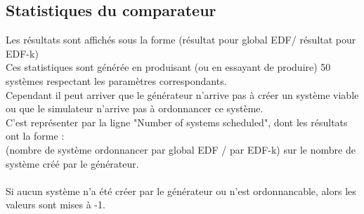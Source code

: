 \documentclass[a4paper,10pt]{article}
\begin{document}
	  
	 \subsection{Statistiques du comparateur}

		Les résultats sont affichés sous la forme (résultat pour global EDF/ résultat pour EDF-k)\\
		Ces statistiques sont générée en produisant (ou en essayant de produire) 50 systèmes respectant les paramètres correspondants.\\
		Cependant il peut arriver que le générateur n'arrive pas à créer un système viable ou que le simulateur n'arrive pas à ordonnancer ce système.\\
		C'est représenter par la ligne "Number of systems scheduled", dont les résultats ont la forme :\\
		(nombre de système ordonnancer par global EDF / par EDF-k) sur le nombre de système créé par le générateur.\\
		~\\
		Si aucun système n'a été créer par le générateur ou n'est ordonnancable, alors les valeurs sont mises à -1.
\end{document}
